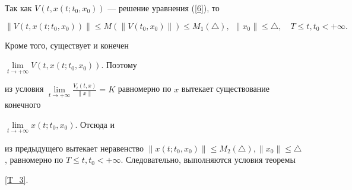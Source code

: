 \begin{pf}


Так как $V(t,x(t;t_{0},x_{0}))$ --- решение уравнения (\ref{6}), то


$$


\|V(t,x(t;t_{0},x_{0}))\| \leq M(\|V(t_{0},x_{0})\|)


\leq M_{1}(\triangle ),\ \ \|x_{0}\| \leq \triangle,\quad


T\leq t,t_{0}<+\infty.


$$


Кроме того, существует и конечен


$\lim\limits_{t\rightarrow +\infty} V(t,x(t;t_{0},x_{0}))$. Поэтому


из условия $\lim\limits_{t\rightarrow +\infty}\frac {V_{i}(t,x)}


{\|x\|}=K$ равномерно по $x$ вытекает существование конечного


$\lim\limits_{t\rightarrow +\infty} x(t;t_{0},x_{0})$. Отсюда и


из предыдущего вытекает неравенство $\|x(t;t_{0},x_{0})\| \leq


M_{2}(\triangle), \|x_{0}\|


\leq \triangle $, равномерно по $T\leq


t,t_{0}<+\infty$. Следовательно, выполняются условия теоремы


\ref{T_3}.


\end{pf}





